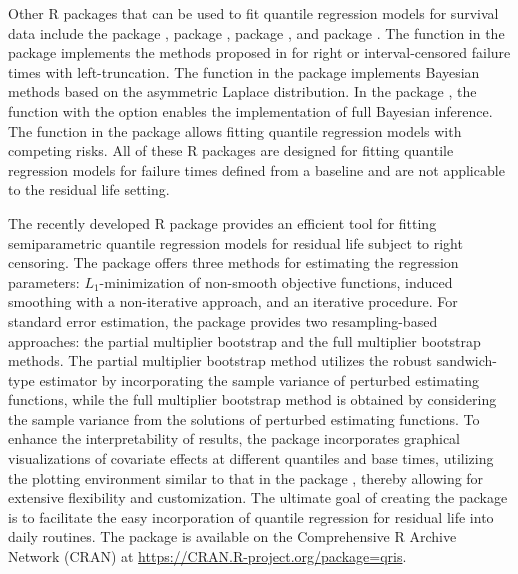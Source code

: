 Other R packages that can be used to fit quantile regression models for survival data include the package 
 \citep{ctqrpackage}, package  \citep{Brqpackage}, package  \citep{brmspackage}, 
and package  \citep{cmprskQRpackage}.
The  function in the package  implements the methods proposed in 
\citet{ctqrpackage} for right or interval-censored failure times with left-truncation.
The  function in the package  implements Bayesian methods based on the 
asymmetric Laplace distribution.
In the package , the  function with the  
option enables the implementation of full Bayesian inference.
The  function in the package  allows fitting quantile regression models 
with competing risks.
All of these R packages are designed for fitting quantile regression models for failure times defined from a baseline 
and are not applicable to the residual life setting.


The recently developed R package  \citep{R:qris} provides an efficient tool for 
fitting semiparametric quantile regression models for residual life subject to right censoring.
The  package offers three methods for estimating the regression parameters: 
$L_1$-minimization of non-smooth objective functions, induced smoothing with a non-iterative approach, 
and an iterative procedure.
For standard error estimation, the  package provides two resampling-based approaches: 
the partial multiplier bootstrap and the full multiplier bootstrap methods. 
The partial multiplier bootstrap method utilizes the robust sandwich-type estimator by 
incorporating the sample variance of perturbed estimating functions, 
while the full multiplier bootstrap method is obtained by considering the sample variance 
from the solutions of perturbed estimating functions.
To enhance the interpretability of results, the  package incorporates 
graphical visualizations of covariate effects at different quantiles and base times, 
utilizing the plotting environment similar to that in the  package \citep{ggplot2package},
thereby allowing for extensive flexibility and customization.
The ultimate goal of creating the  package is to facilitate 
the easy incorporation of quantile regression for residual life into daily routines. 
The package  is available on the Comprehensive R Archive Network (CRAN) at 
\url{https://CRAN.R-project.org/package=qris}.

